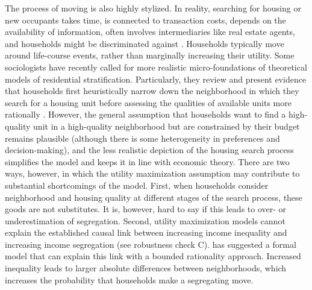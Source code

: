 \documentclass[a4paper,12pt]{article}
\begin{document}
The process of moving is also highly stylized. In reality, searching for housing or new occupants takes time, is connected to transaction costs, depends on the availability of information, often involves intermediaries like real estate agents, and households might be discriminated against \citep{hanMicrostructureHousingMarkets2015}. Households typically move around life-course events, rather than marginally increasing their utility. Some sociologists have recently called for more realistic micro-foundations of theoretical models of residential stratification. Particularly, they review and present evidence that households first heuristically narrow down the neighborhood in which they search for a housing unit before assessing the qualities of available units more rationally \citep{krysanCycleSegregationSocial2017, bruchChoiceSetFormation2019}. However, the general assumption that households want to find a high-quality unit in a high-quality neighborhood but are constrained by their budget remains plausible (although there is some heterogeneity in preferences and decision-making), and the less realistic depiction of the housing search process simplifies the model and keeps it in line with economic theory. There are two ways, however, in which the utility maximization assumption may contribute to substantial shortcomings of the model. First, when households consider neighborhood and housing quality at different stages of the search process, these goods are not substitutes. It is, however, hard to say if this leads to over- or underestimation of segregation. Second, utility maximization models cannot explain the established causal link between increasing income inequality and increasing income segregation (see robustness check C). \citet{yavasDissectingIncomeSegregation2019} has suggested a formal model that can explain this link with a bounded rationality approach. Increased inequality leads to larger absolute differences between neighborhoods, which increases the probability that households make a segregating move.

\end{document}

